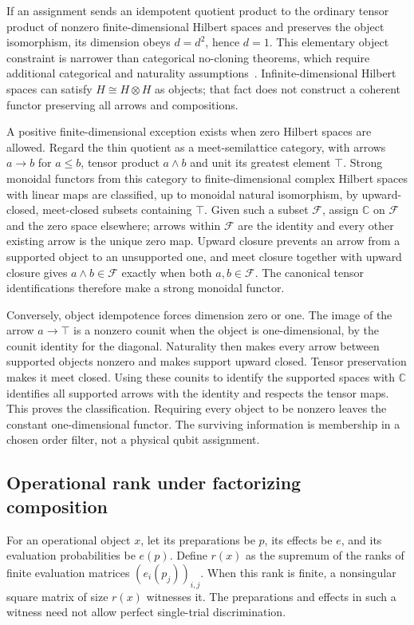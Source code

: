 If an assignment sends an idempotent quotient product to the ordinary tensor product of nonzero finite-dimensional Hilbert spaces and preserves the object isomorphism, its dimension obeys $d=d^2$, hence $d=1$. This elementary object constraint is narrower than categorical no-cloning theorems, which require additional categorical and naturality assumptions~\cite{abramsky}. Infinite-dimensional Hilbert spaces can satisfy $H\cong H\otimes H$ as objects; that fact does not construct a coherent functor preserving all arrows and compositions.

A positive finite-dimensional exception exists when zero Hilbert spaces are allowed. Regard the thin quotient as a meet-semilattice category, with arrows $a\to b$ for $a\le b$, tensor product $a\wedge b$ and unit its greatest element $\top$. Strong monoidal functors from this category to finite-dimensional complex Hilbert spaces with linear maps are classified, up to monoidal natural isomorphism, by upward-closed, meet-closed subsets containing $\top$. Given such a subset $\mathcal F$, assign $\mathbb C$ on $\mathcal F$ and the zero space elsewhere; arrows within $\mathcal F$ are the identity and every other existing arrow is the unique zero map. Upward closure prevents an arrow from a supported object to an unsupported one, and meet closure together with upward closure gives
$a\wedge b\in\mathcal F$ exactly when both $a,b\in\mathcal F$. The canonical tensor identifications therefore make a strong monoidal functor.

Conversely, object idempotence forces dimension zero or one. The image of the arrow $a\to\top$ is a nonzero counit when the object is one-dimensional, by the counit identity for the diagonal. Naturality then makes every arrow between supported objects nonzero and makes support upward closed. Tensor preservation makes it meet closed. Using these counits to identify the supported spaces with $\mathbb C$ identifies all supported arrows with the identity and respects the tensor maps. This proves the classification. Requiring every object to be nonzero leaves the constant one-dimensional functor. The surviving information is membership in a chosen order filter, not a physical qubit assignment.

\subsection{Operational rank under factorizing composition}
\label{rec:operational-rank}

For an operational object \(x\), let its preparations be \(p\), its
effects be \(e\), and its evaluation probabilities be \(e(p)\).
Define \(r(x)\) as the supremum of the ranks of finite evaluation
matrices \((e_i(p_j))_{i,j}\).  When this rank is finite, a nonsingular
square matrix of size \(r(x)\) witnesses it.  The preparations and
effects in such a witness need not allow perfect single-trial
discrimination.

